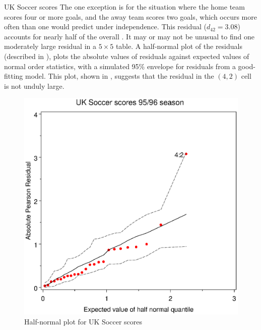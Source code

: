 \begin{Example}[soccer2]{UK Soccer scores}
The one exception is for the situation where the home team scores
four or more goals, and the away team scores two goals, which occurs
more often than one would predict under independence.
This residual ($d_{42} = 3.08$) accounts for nearly half of the overall
\chisq{}.
It may or may not be unusual to find one moderately large residual
in a $5 \times 5$ table.
A half-normal plot of the residuals
(described in ),
plots the absolute values of residuals
against expected values of normal
order statistics, with a simulated 95\% envelope for residuals from a
good-fitting model.
This plot, shown in , suggests that the residual in
the $(4, 2)$ cell is not unduly large.


\begin{figure}[htb]
  \centering
  \includegraphics[scale=.6]{ch4/fig/soccer4}
  \caption[Half-normal plot for UK Soccer scores]{Half-normal plot for UK Soccer scores}\label{fig:soccer4}
\end{figure}
\end{Example}
